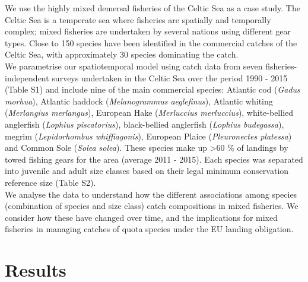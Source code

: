 \documentclass[fleqn,10pt]{wlscirep}
\begin{document}
\begin{linenumbers}
We use the highly mixed demersal fisheries of the Celtic Sea as a case study.
The Celtic Sea is a temperate sea where fisheries are spatially and temporally
complex; mixed fisheries are undertaken by several nations using different gear
types\cite{Ellis2000, Gerritsen2012}. Close to 150 species have been
identified in the commercial catches of the Celtic Sea, with approximately 30
species dominating the catch\cite{Mateo2016}.\\

We parametrise our spatiotemporal model using catch data from seven
fisheries-independent surveys undertaken in the Celtic Sea over the period 1990
- 2015 (Table S1) and include nine of the main commercial species: Atlantic cod
(\textit{Gadus morhua}), Atlantic haddock (\textit{Melanogrammus aeglefinus}),
Atlantic whiting (\textit{Merlangius merlangus}), European Hake
(\textit{Merluccius merluccius}), white-bellied anglerfish (\textit{Lophius
	piscatorius}), black-bellied anglerfish (\textit{Lophius budegassa}),
megrim (\textit{Lepidorhombus whiffiagonis}), European Plaice
(\textit{Pleuronectes platessa}) and Common Sole (\textit{Solea solea}). These
species make up \textgreater 60 \% of landings by towed fishing gears for the
area (average 2011 - 2015\cite{STECF2017}). Each species was separated into
juvenile and adult size classes based on their legal minimum conservation
reference size (Table S2).\\

We analyse the data to understand how the different associations among species
(combination of species and size class)  catch
compositions  in mixed fisheries. We
consider how these have changed over time, and the implications for mixed
fisheries in managing catches of quota species under the EU landing
obligation.\\

\section*{Results\\}


\end{linenumbers}
\end{document}
